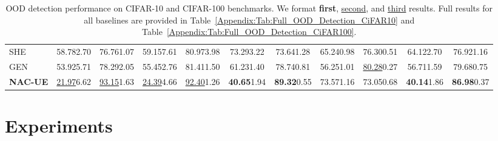 \documentclass{article} \usepackage{iclr2024_conference,times}
\begin{document}
\begin{table*}
{\begin{tabular}{l cc cc cc cc cc}
			SHE & 58.78{\tiny2.70} &  76.76{\tiny1.07} &  59.15{\tiny7.61} &  80.97{\tiny3.98} &  73.29{\tiny3.22} &  73.64{\tiny1.28} &  65.24{\tiny0.98} &  76.30{\tiny0.51} &  64.12{\tiny2.70} &  76.92{\tiny1.16 }\\ 
			GEN & 53.92{\tiny5.71} &  78.29{\tiny2.05} &  55.45{\tiny2.76} &  81.41{\tiny1.50} &  61.23{\tiny1.40} &  78.74{\tiny0.81} &  56.25{\tiny1.01} &  \underline{80.28}{\tiny0.27} &  56.71{\tiny1.59} &  79.68{\tiny0.75 }\\ 
			\rowcolor{LightGray}
			\textbf{NAC-UE} & \underline{21.97}{\tiny6.62 } &  \underline{93.15}{\tiny1.63 } &  \underline{24.39}{\tiny4.66 } &  \underline{92.40}{\tiny1.26 } &  \textbf{40.65}{\tiny1.94 } &  \textbf{89.32}{\tiny0.55 } &  73.57{\tiny1.16  } &  73.05{\tiny0.68 } &  \textbf{40.14}{\tiny1.86 } &  \textbf{86.98}{\tiny0.37 }\\ 
			
			\bottomrule
		\end{tabular}
	}
	\vspace{-1.5mm}
	\caption{OOD detection performance on CIFAR-10 and CIFAR-100 benchmarks. We format \textbf{first}, \underline{second}, and \underline{third} results. Full results for all baselines are provided in Table~\ref{Appendix:Tab:Full_OOD_Detection_CiFAR10} and Table~\ref{Appendix:Tab:Full_OOD_Detection_CiFAR100}.}
	\label{table:OOD_Detection_CIFAR}
	\vspace{-2mm}
\end{table*}










\vspace{-2mm}
\section{Experiments}
\vspace{-2mm}
\end{document}
